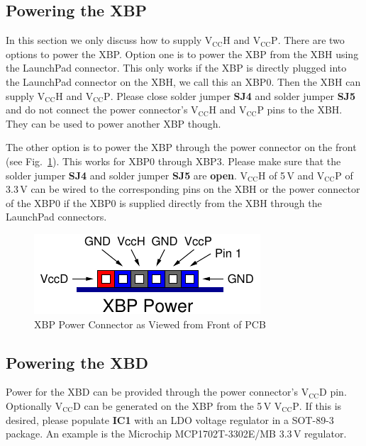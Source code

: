 \documentclass[twoside,11pt]{cergdoc}
\begin{document}
\subsection{Powering the XBP}
In this section we only discuss how to supply $\mathrm{V_{CC}H}$ and $\mathrm{V_{CC}P}$.
There are two options to power the XBP. Option one is to power the XBP from the
XBH using the LaunchPad connector. This only works if the XBP is directly plugged into the 
LaunchPad connector on the XBH, 
we call this an XBP0. Then the XBH can supply $\mathrm{V_{CC}H}$ and $\mathrm{V_{CC}P}$.
Please close solder jumper \textbf{SJ4} and solder jumper \textbf{SJ5} and do not connect
the power connector's $\mathrm{V_{CC}H}$ and $\mathrm{V_{CC}P}$ pins to the XBH. 
They can be used to power another XBP though.

The other option is to power the XBP through the power connector on the front 
(see Fig.~\ref{fig:power}). This works for XBP0 through XBP3. Please make sure that the
solder jumper \textbf{SJ4} and solder jumper \textbf{SJ5} are \textbf{open}. 
$\mathrm{V_{CC}H}$ of 5\,V and $\mathrm{V_{CC}P}$ of 3.3\,V can be wired to the 
corresponding pins on the XBH or the power connector of the XBP0 if the XBP0 is supplied directly from the
XBH through the LaunchPad connectors.


\begin{figure}[ht]
  \begin{center}
    \includegraphics[scale=1]{figures/xbp_power}
    \caption{XBP Power Connector as Viewed from Front of PCB}\label{fig:power}
  \end{center}
\end{figure}

\subsection{Powering the XBD}\label{sec:vccd}
Power for the XBD can be provided through the power connector's $\mathrm{V_{CC}D}$ pin.
Optionally $\mathrm{V_{CC}D}$ can be generated on the XBP from the 5\,V $\mathrm{V_{CC}P}$.
If this is desired, please populate \textbf{IC1} with an LDO voltage regulator in a 
SOT-89-3 package. An example is the Microchip MCP1702T-3302E/MB 3.3\,V regulator.
\end{document}
